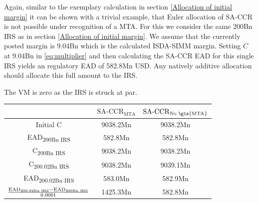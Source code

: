 \documentclass[../Thesis_AHoecherl.tex]{subfiles}
\begin{document}
    Again, similar to the exemplary calculation in section \ref{Allocation of initial margin} it can be shown with a trivial example, that Euler allocation of SA-CCR is not possible under recognition of a \gls{MTA}. 
    For this we consider the same 200Bn \gls{IRS} as in section \ref{Allocation of initial margin}. We assume that the currently posted margin is 9.04Bn which is the calculated ISDA-SIMM margin. Setting $C$ at 9.04Bn in \ref{eq:multiplier} and then calculating the SA-CCR EAD for this single IRS  yields an regulatory EAD of 582.8Mn USD. Any natively additive allocation should allocate this full amount to the IRS.
    
    The \gls{VM} is zero as the IRS is struck at par.
    \begin{table}[htbp]
        \centering
            \begin{tabular}{c|c|c}
                & $\text{SA-CCR}_{\text{MTA}}$ & $\text{SA-CCR}_{\text{No \gls{MTA}}}$ \\
                \toprule
                Initial C & 9038.2Mn & 9038.2Mn \\
                \midrule
                EAD\textsubscript{200Bn IRS} & 582.8Mn & 582.8Mn \\
                \midrule
                C\textsubscript{200Bn IRS} & 9038.2Mn & 9038.2Mn \\
                \midrule
                C\textsubscript{200.02Bn IRS} & 9038.2Mn & 9039.1Mn \\
                \midrule
                EAD\textsubscript{200.02Bn IRS} & 583.0Mn & 582.9Mn \\
                \midrule
                $\frac{\text{EAD\textsubscript{200.02Bn IRS}}-\text{EAD\textsubscript{200Bn IRS}}}{0.0001}$ & 1425.3Mn & 582.8Mn  \\

\end{tabular}
\end{table}
\end{document}
